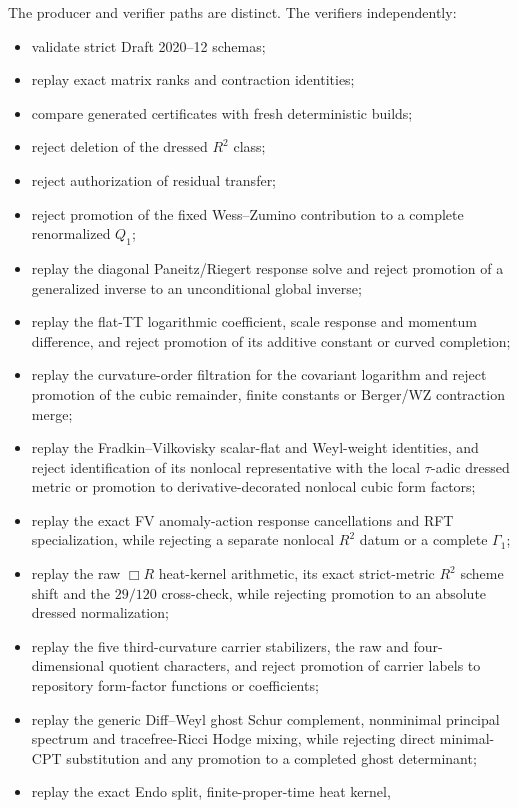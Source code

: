 \documentclass[11pt]{article}
\theoremstyle{definition}
\theoremstyle{remark}
\begin{document}
The producer and verifier paths are distinct.  The verifiers independently:
\begin{itemize}
\item validate strict Draft 2020--12 schemas;
\item replay exact matrix ranks and contraction identities;
\item compare generated certificates with fresh deterministic builds;
\item reject deletion of the dressed $R^2$ class;
\item reject authorization of residual transfer;
\item reject promotion of the fixed Wess--Zumino contribution to a complete
renormalized $Q_1$;
\item replay the diagonal Paneitz/Riegert response solve and reject promotion
of a generalized inverse to an unconditional global inverse;
\item replay the flat-TT logarithmic coefficient, scale response and momentum
difference, and reject promotion of its additive constant or curved
completion;
\item replay the curvature-order filtration for the covariant logarithm and
reject promotion of the cubic remainder, finite constants or Berger/WZ
contraction merge;
\item replay the Fradkin--Vilkovisky scalar-flat and Weyl-weight identities,
and reject identification of its nonlocal representative with the local
$\tau$-adic dressed metric or promotion to derivative-decorated nonlocal cubic form factors;
\item replay the exact FV anomaly-action response cancellations and RFT
specialization, while rejecting a separate nonlocal $R^2$ datum or a complete
$\Gamma_1$;
\item replay the raw $\Box R$ heat-kernel arithmetic, its exact strict-metric
$R^2$ scheme shift and the $29/120$ cross-check, while rejecting promotion to
an absolute dressed normalization;
\item replay the five third-curvature carrier stabilizers, the raw and
four-dimensional quotient characters, and reject promotion of carrier labels
to repository form-factor functions or coefficients;
\item replay the generic Diff--Weyl ghost Schur complement, nonminimal
principal spectrum and tracefree-Ricci Hodge mixing, while rejecting direct
minimal-CPT substitution and any promotion to a completed ghost determinant;
\item replay the exact Endo split, finite-proper-time heat kernel,

\end{itemize}
\end{document}
